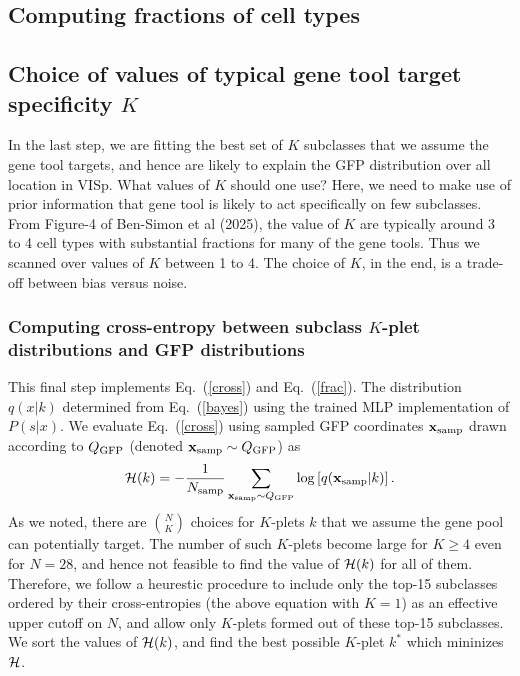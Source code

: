 \documentclass{article}
\newcommand\beq{\begin{equation}}
\newcommand\eeq[1]{\label{#1}\end{equation}}
\newcommand\eqn[1]{Eq.\ (\ref{#1})}
\begin{document}
\subsection{Computing fractions of cell types}

\subsection{Choice of values of typical gene tool target specificity $K$} 

In the last step, we are fitting the best set of $K$ subclasses
that we assume the gene tool targets, and hence are likely to explain
the GFP distribution over all location in VISp. What values of $K$
should one use?  Here, we need to make use of prior information
that gene tool is likely to act specifically on few subclasses.
From Figure-4 of Ben-Simon et al (2025), the value of $K$ are
typically around 3 to 4 cell types with substantial fractions for
many of the gene tools.  Thus we scanned over values of $K$ between
1 to 4. The choice of $K$, in the end, is a trade-off between bias
versus noise.

\subsubsection{Computing cross-entropy between subclass $K$-plet distributions and GFP distributions}

This final step implements \eqn{cross} and \eqn{frac}. The distribution 
$q(x|k)$ determined from \eqn{bayes} using the trained MLP implementation of 
$P(s|x)$. We evaluate \eqn{cross} using sampled GFP coordinates $\mathbf{x}_{\rm samp}$ 
drawn according to $Q_{\rm GFP}$ (denoted $\mathbf{x}_{\rm samp}\sim Q_{\rm GFP}$) as 
\beq
{\cal H}(k) = -\frac{1}{N_{\rm samp}} \sum_{\mathbf{x}_{\rm samp}\sim Q_{\rm GFP} } \log\left[ q(\mathbf{x}_{\rm samp} |k)\right].
\eeq{mccross}
As we noted, there are $\binom{N}{K}$ choices for $K$-plets $k$
that we assume the gene pool can potentially target. The number of
such $K$-plets become large for $K\ge 4$ even for $N=28$, and hence
not feasible to find the value of ${\cal H}(k)$ for all of them.
Therefore, we follow a heurestic procedure to include only the
top-15 subclasses ordered by their cross-entropies (the above
equation with $K=1$) as an effective upper cutoff on $N$, and allow
only $K$-plets formed out of these top-15 subclasses.  We sort the
values of ${\cal H}(k)$, and find the best possible $K$-plet $k^*$
which mininizes ${\cal H}$.
\end{document}
